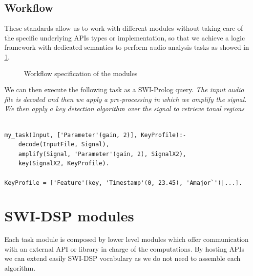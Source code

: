 \documentclass{article}
\begin{document}
\subsection{Workflow}

These standards allow us to work with different modules without taking care of the specific underlying APIs types or implementation, so that we achieve a logic framework with dedicated semantics to perform audio analysis tasks as showed in \ref{fig:workflow}.

\begin{figure}
\centerline{}
\caption{Workflow specification of the modules}
\label{fig:workflow}
\end{figure}

We can then execute the following task as a SWI-Prolog query. \textit{The input audio file is decoded and then we apply a pre-processing in which we amplify the signal. We then apply a key detection algorithm over the signal to retrieve tonal regions}

\begin{verbatim}
 
my_task(Input, ['Parameter'(gain, 2)], KeyProfile):-
	decode(InputFile, Signal),
	amplify(Signal, 'Parameter'(gain, 2), SignalX2),
	key(SignalX2, KeyProfile).

KeyProfile = ['Feature'(key, 'Timestamp'(0, 23.45), 'Amajor`')|...].	

\end{verbatim}

\section{SWI-DSP modules}

Each task module is composed by lower level modules which offer communication with an external API or library in charge of the computations. By hosting APIs we can extend easily SWI-DSP vocabulary as we do not need to assemble each algorithm.
\end{document}
